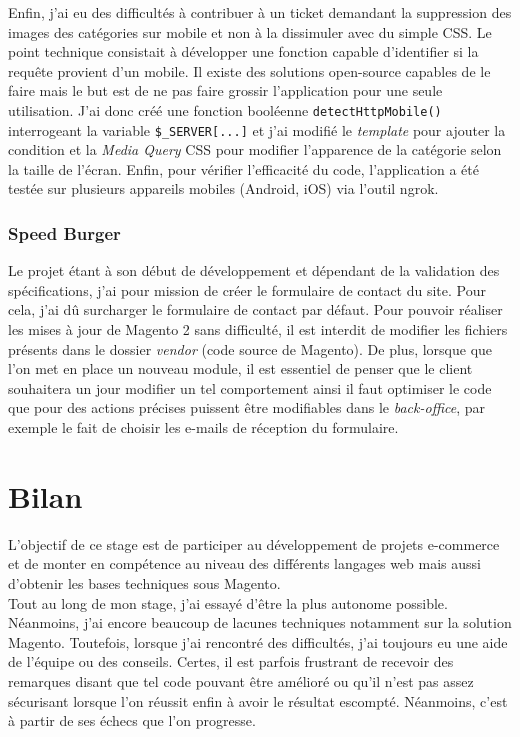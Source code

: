 \documentclass[12pt, a4paper, twoside]{report}
\begin{document}
Enfin, j'ai eu des difficultés à contribuer à un ticket demandant la suppression des images des catégories sur mobile et non à la dissimuler avec du simple CSS. Le point technique consistait à développer une fonction capable d'identifier si la requête provient d'un mobile. Il existe des solutions open-source capables de le faire mais le but est de ne pas faire grossir l'application pour une seule utilisation. J'ai donc créé une fonction booléenne \texttt{detectHttpMobile()} interrogeant la variable \texttt{\$\_SERVER[...]} et j'ai modifié le \textit{template} pour ajouter la condition et la \textit{Media Query} CSS pour modifier l'apparence de la catégorie selon la taille de l'écran. Enfin, pour vérifier l'efficacité du code, l'application a été testée sur plusieurs appareils mobiles (Android, iOS) via l'outil ngrok.

\subsection{Speed Burger}

Le projet étant à son début de développement et dépendant de la validation des spécifications, j'ai pour mission de créer le formulaire de contact du site. Pour cela, j'ai dû surcharger le formulaire de contact par défaut. Pour pouvoir réaliser les mises à jour de Magento 2 sans difficulté, il est interdit de modifier les fichiers présents dans le dossier \textit{vendor} (code source de Magento). De plus, lorsque que l'on met en place un nouveau module, il est essentiel de penser que le client souhaitera un jour modifier un tel comportement ainsi il faut optimiser le code que pour des actions précises puissent être modifiables dans le \textit{back-office}, par exemple le fait de choisir les e-mails de réception du formulaire. \\

\chapter{Bilan}

L'objectif de ce stage est de participer au développement de projets e-commerce et de monter en compétence au niveau des différents langages web mais aussi d'obtenir les bases techniques sous Magento. \\

Tout au long de mon stage, j'ai essayé d'être la plus autonome possible. Néanmoins, j'ai encore beaucoup de lacunes techniques notamment sur la solution Magento. Toutefois, lorsque j'ai rencontré des difficultés, j'ai toujours eu une aide de l'équipe ou des conseils. Certes, il est parfois frustrant de recevoir des remarques disant que tel code pouvant être amélioré ou qu'il n'est pas assez sécurisant lorsque l'on réussit enfin à avoir le résultat escompté. Néanmoins, c'est à partir de ses échecs que l'on progresse. \\
\end{document}
